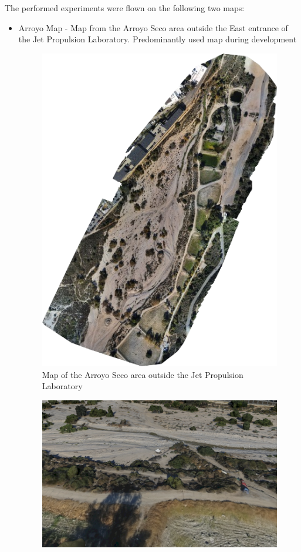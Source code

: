 The performed experiments were flown on the following two maps:
\begin{itemize}
    \item Arroyo Map - Map from the Arroyo Seco area outside the East entrance of the Jet Propulsion Laboratory. Predominantly used map during development
    \begin{figure}[h]
        \centering
        \includegraphics[scale=0.5]{images/evaluation/arroyo.png}
        \caption{Map of the Arroyo Seco area outside the Jet Propulsion Laboratory}
    \end{figure}
    \begin{figure}[h]
        \centering
        \includegraphics[scale=0.23]{images/evaluation/arroyo_map.png}

\end{figure}
\end{itemize}
